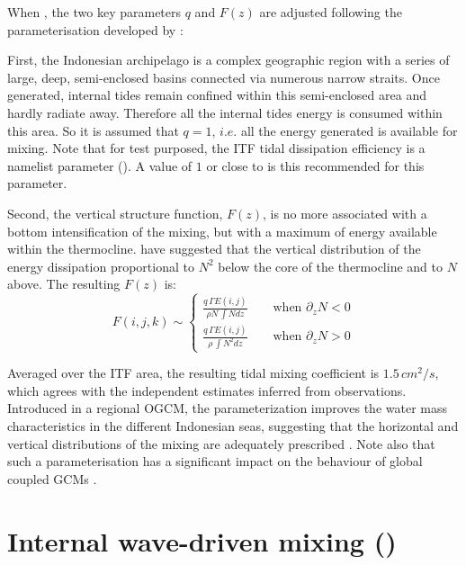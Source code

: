 \documentclass[../tex_main/NEMO_manual]{subfiles}
\begin{document}
When , the two key parameters $q$ and $F(z)$ are adjusted following
the parameterisation developed by \citet{Koch-Larrouy_al_GRL07}:

First, the Indonesian archipelago is a complex geographic region with a series of
large, deep, semi-enclosed basins connected via numerous narrow straits.
Once generated, internal tides remain confined within this semi-enclosed area and hardly radiate away.
Therefore all the internal tides energy is consumed within this area.
So it is assumed that $q = 1$, $i.e.$ all the energy generated is available for mixing.
Note that for test purposed, the ITF tidal dissipation efficiency is a namelist parameter ().
A value of $1$ or close to is this recommended for this parameter.

Second, the vertical structure function, $F(z)$, is no more associated with a bottom intensification of the mixing,
but with a maximum of energy available within the thermocline.
\citet{Koch-Larrouy_al_GRL07} have suggested that the vertical distribution of
the energy dissipation proportional to $N^2$ below the core of the thermocline and to $N$ above. 
The resulting $F(z)$ is:
\begin{equation} \label{eq:Fz_itf}
F(i,j,k) \sim     \left\{ \begin{aligned}
\frac{q\,\Gamma E(i,j) } {\rho N \, \int N     dz}    \qquad \text{when $\partial_z N < 0$} \\
\frac{q\,\Gamma E(i,j) } {\rho     \, \int N^2 dz}    \qquad \text{when $\partial_z N > 0$}
                      \end{aligned} \right.
\end{equation}

Averaged over the ITF area, the resulting tidal mixing coefficient is $1.5\,cm^2/s$, 
which agrees with the independent estimates inferred from observations.
Introduced in a regional OGCM, the parameterization improves the water mass characteristics in
the different Indonesian seas, suggesting that the horizontal and vertical distributions of
the mixing are adequately prescribed \citep{Koch-Larrouy_al_GRL07, Koch-Larrouy_al_OD08a, Koch-Larrouy_al_OD08b}.
Note also that such a parameterisation has a significant impact on the behaviour of
global coupled GCMs \citep{Koch-Larrouy_al_CD10}.


\section{Internal wave-driven mixing (\protect{})}
\label{sec:ZDF_tmx_new}
\end{document}
